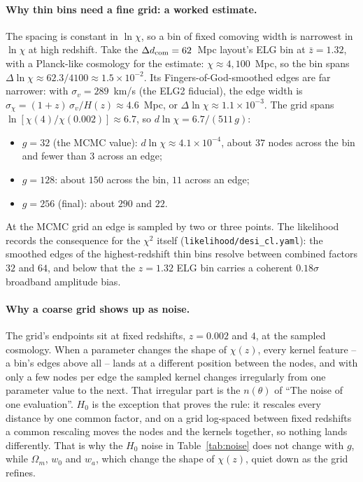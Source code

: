 \documentclass[11pt]{article}
\newcommand{\us}{\_\allowbreak}
\begin{document}
\paragraph{Why thin bins need a fine grid: a worked estimate.}
The spacing is constant in $\ln\chi$, so a bin of fixed comoving width
is narrowest in $\ln\chi$ at high redshift.  Take the
$\Delta d_{\rm com} = 62$~Mpc layout's ELG bin at $\bar{z} = 1.32$,
with a Planck-like cosmology for the estimate: $\chi \approx
4{,}100$~Mpc, so the bin spans $\Delta\ln\chi \approx 62.3/4100
\approx 1.5\times10^{-2}$.  Its Fingers-of-God-smoothed edges are far
narrower: with $\sigma_v = 289$~km/s (the ELG2 fiducial), the edge
width is $\sigma_\chi = (1+z)\,\sigma_v/H(z) \approx 4.6$~Mpc, or
$\Delta\ln\chi \approx 1.1\times10^{-3}$.  The grid spans
$\ln[\chi(4)/\chi(0.002)] \approx 6.7$, so
$d\ln\chi = 6.7/(511\,g)$:
\begin{itemize}
  \item $g = 32$ (the MCMC value): $d\ln\chi \approx 4.1\times10^{-4}$,
    about $37$ nodes across the bin and fewer than $3$ across an edge;
  \item $g = 128$: about $150$ across the bin, $11$ across an edge;
  \item $g = 256$ (final): about $290$ and $22$.
\end{itemize}
At the MCMC grid an edge is sampled by two or three points.  The
likelihood records the consequence for the $\chi^2$ itself
(\texttt{likelihood/desi\us cl.yaml}): the smoothed edges of the
highest-redshift thin bins resolve between combined factors $32$ and
$64$, and below that the $z = 1.32$ ELG bin carries a coherent
$0.18\sigma$ broadband amplitude bias.

\paragraph{Why a coarse grid shows up as noise.}
The grid's endpoints sit at fixed redshifts, $z = 0.002$ and $4$, at
the sampled cosmology.  When a parameter changes the shape of
$\chi(z)$, every kernel feature -- a bin's edges above all -- lands at
a different position between the nodes, and with only a few nodes per
edge the sampled kernel changes irregularly from one parameter value
to the next.  That irregular part is the $n(\theta)$ of ``The noise of
one evaluation''.  $H_0$ is the exception that proves the rule: it
rescales every distance by one common factor, and on a grid log-spaced
between fixed redshifts a common rescaling moves the nodes and the
kernels together, so nothing lands differently.  That is why the $H_0$
noise in Table~\ref{tab:noise} does not change with $g$, while
$\Omega_m$, $w_0$ and $w_a$, which change the shape of $\chi(z)$,
quiet down as the grid refines.
\end{document}
